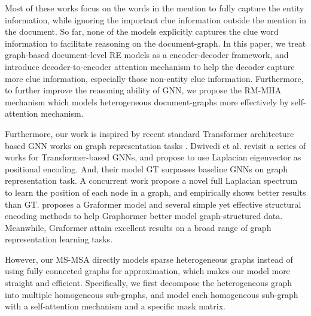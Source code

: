 \documentclass[sigconf,natbib=true]{acmart}
\begin{document}
Most of these works focus on the words in the mention to fully capture the entity information, while ignoring the important clue information outside the mention in the document. 
So far, none of the models explicitly captures the clue word information to facilitate reasoning on the document-graph.
In this paper, we treat graph-based document-level RE models as a encoder-decoder framework, and introduce decoder-to-encoder attention mechanism to help the decoder capture more clue information, especially those non-entity clue information.
Furthermore, to further improve the reasoning ability of GNN, we propose the RM-MHA mechanism which models heterogeneous document-graphs more effectively by self-attention mechanism.

Furthermore, our work is inspired by recent standard Transformer
architecture based GNN works on graph representation tasks \cite{c:1,c:3,c:4}.
Dwivedi et al. \cite{c:3} revisit a series of works for Transformer-based GNNs, and propose to use Laplacian eigenvector as positional encoding. 
And, their model GT surpasses baseline GNNs on graph representation task.
A concurrent work \cite{c:4} propose a novel full Laplacian spectrum to learn the position of each node in a graph, and empirically shows better results than GT.
\cite{c:1} proposes a Graformer model and  several simple yet effective structural encoding methods to help Graphormer better model graph-structured data. 
Meanwhile, Graformer attain excellent results on a broad range of graph representation learning tasks. 

However, our MS-MSA directly models sparse heterogeneous graphs instead of using fully connected graphs for approximation, which makes our model more straight and efficient.
Specifically, we first decompose the heterogeneous graph into multiple homogeneous sub-graphs, and model each homogeneous sub-graph with a self-attention mechanism and a specific mask matrix.  

\end{document}
